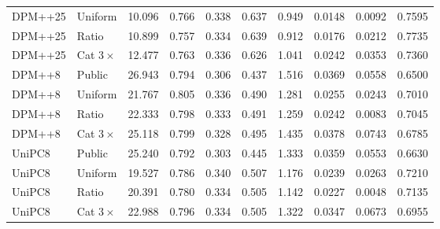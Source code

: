 \begin{table}[t]
\begin{tabular}{llrrrrrrrr}
DPM++25 & Uniform & 10.096 & 0.766 & 0.338 & 0.637 & 0.949 & 0.0148 & 0.0092 & 0.7595 \\
DPM++25 & Ratio & 10.899 & 0.757 & 0.334 & 0.639 & 0.912 & 0.0176 & 0.0212 & 0.7735 \\
DPM++25 & Cat $3\times$ & 12.477 & 0.763 & 0.336 & 0.626 & 1.041 & 0.0242 & 0.0353 & 0.7360 \\
\midrule
DPM++8 & Public & 26.943 & 0.794 & 0.306 & 0.437 & 1.516 & 0.0369 & 0.0558 & 0.6500 \\
DPM++8 & Uniform & 21.767 & 0.805 & 0.336 & 0.490 & 1.281 & 0.0255 & 0.0243 & 0.7010 \\
DPM++8 & Ratio & 22.333 & 0.798 & 0.333 & 0.491 & 1.259 & 0.0242 & 0.0083 & 0.7045 \\
DPM++8 & Cat $3\times$ & 25.118 & 0.799 & 0.328 & 0.495 & 1.435 & 0.0378 & 0.0743 & 0.6785 \\
\midrule
UniPC8 & Public & 25.240 & 0.792 & 0.303 & 0.445 & 1.333 & 0.0359 & 0.0553 & 0.6630 \\
UniPC8 & Uniform & 19.527 & 0.786 & 0.340 & 0.507 & 1.176 & 0.0239 & 0.0263 & 0.7210 \\
UniPC8 & Ratio & 20.391 & 0.780 & 0.334 & 0.505 & 1.142 & 0.0227 & 0.0048 & 0.7135 \\
UniPC8 & Cat $3\times$ & 22.988 & 0.796 & 0.334 & 0.505 & 1.322 & 0.0347 & 0.0673 & 0.6955 \\
\bottomrule
\end{tabular}
\end{table}

